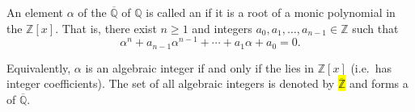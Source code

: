 \begin{definition} \label{definition:algebraic_integer}
An element $\alpha$ of the  $\overline{\mathbb{Q}}$ of $\mathbb{Q}$ is called an  if it is a root of a monic polynomial in the  $\mathbb{Z}[x]$. That is, there exist $n \geq 1$ and integers $a_0, a_1, \dots, a_{n-1} \in \mathbb{Z}$ such that
$$\alpha^n + a_{n-1}\alpha^{n-1} + \cdots + a_1\alpha + a_0 = 0.$$

Equivalently, $\alpha$ is an algebraic integer if and only if the  lies in $\mathbb{Z}[x]$ (i.e.\ has integer coefficients). The set of all algebraic integers is denoted by \hl{$\overline{\mathbb{Z}}$} and forms a  of $\overline{\mathbb{Q}}$.
\end{definition}
